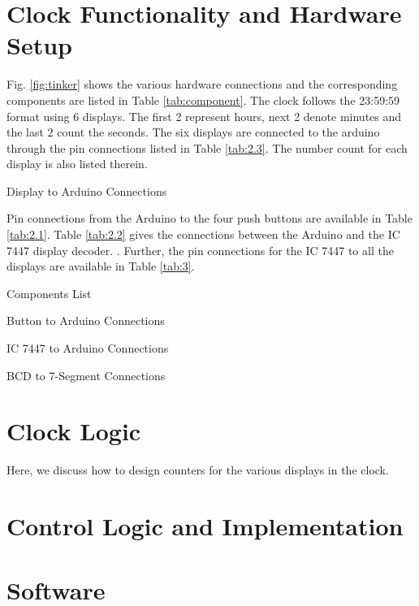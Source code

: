 \documentclass[conference]{IEEEtran}
\begin{document}
%
%
\section{Clock Functionality and Hardware Setup}
Fig. \ref{fig:tinker}  shows the various hardware connections and the corresponding components are listed in 
Table \ref{tab:component}.  The clock follows the 23:59:59 format using 6 displays.  The first 2 represent hours, next 2 denote minutes and the last 2 count the seconds.  
The six displays are connected to the arduino through the pin connections listed in Table \ref{tab:2.3}.  The number count for each display is also listed therein.
\begin{table}[!h]
\centering

\caption{Display to Arduino Connections}
\label{tab:2.3}
\end{table}
Pin connections from the Arduino to the four push buttons are available in 
Table \ref{tab:2.1}. Table \ref{tab:2.2} gives the connections between the Arduino and the IC 7447 display decoder.  .  Further, the pin connections for the IC 7447 to all the displays are available in Table \ref{tab:3}.

%

\begin{table}[!h]
\centering

\caption{Components List}
\label{tab:component}
\end{table}
\begin{table}[!h]
\centering

\caption{Button to Arduino Connections}
\label{tab:2.1}
\end{table}
\begin{table}[!h]
\centering

\caption{IC 7447 to Arduino Connections}
\label{tab:2.2}
\end{table}
\begin{table}[!h]
\centering

\caption{BCD to 7-Segment Connections}
\label{tab:3}
\end{table}
\section{Clock Logic}
Here, we discuss how to design counters for the various displays in the clock.

\section{Control Logic and Implementation}




\section{Software}

%



\end{document}
